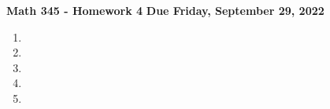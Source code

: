 \documentclass[12pt]{article}
\begin{document}
\pagestyle{fancy}
\fancyhf{}

\noindent \textbf{Math 345 - Homework 4} \hspace{2.7in} \textbf{Due Friday, September 29, 2022}
\raggedright
\begin{enumerate}
    \item \newpage
    \item \newpage
    \item \vspace{1cm}
    \item \newpage
    \item 
\end{enumerate}
\end{document}
